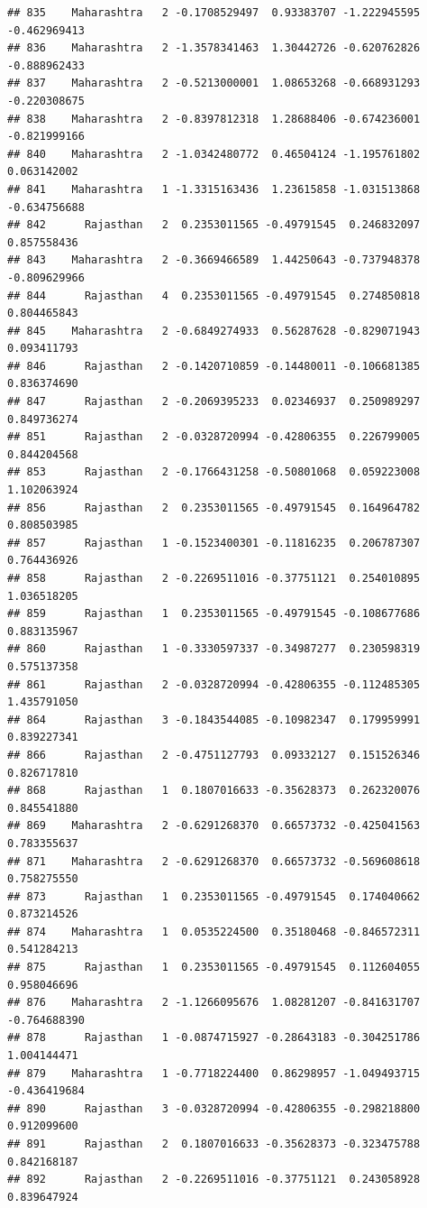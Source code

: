 \documentclass[
]{article}
\begin{document}
\begin{verbatim}
## 835    Maharashtra   2 -0.1708529497  0.93383707 -1.222945595 -0.462969413
## 836    Maharashtra   2 -1.3578341463  1.30442726 -0.620762826 -0.888962433
## 837    Maharashtra   2 -0.5213000001  1.08653268 -0.668931293 -0.220308675
## 838    Maharashtra   2 -0.8397812318  1.28688406 -0.674236001 -0.821999166
## 840    Maharashtra   2 -1.0342480772  0.46504124 -1.195761802  0.063142002
## 841    Maharashtra   1 -1.3315163436  1.23615858 -1.031513868 -0.634756688
## 842      Rajasthan   2  0.2353011565 -0.49791545  0.246832097  0.857558436
## 843    Maharashtra   2 -0.3669466589  1.44250643 -0.737948378 -0.809629966
## 844      Rajasthan   4  0.2353011565 -0.49791545  0.274850818  0.804465843
## 845    Maharashtra   2 -0.6849274933  0.56287628 -0.829071943  0.093411793
## 846      Rajasthan   2 -0.1420710859 -0.14480011 -0.106681385  0.836374690
## 847      Rajasthan   2 -0.2069395233  0.02346937  0.250989297  0.849736274
## 851      Rajasthan   2 -0.0328720994 -0.42806355  0.226799005  0.844204568
## 853      Rajasthan   2 -0.1766431258 -0.50801068  0.059223008  1.102063924
## 856      Rajasthan   2  0.2353011565 -0.49791545  0.164964782  0.808503985
## 857      Rajasthan   1 -0.1523400301 -0.11816235  0.206787307  0.764436926
## 858      Rajasthan   2 -0.2269511016 -0.37751121  0.254010895  1.036518205
## 859      Rajasthan   1  0.2353011565 -0.49791545 -0.108677686  0.883135967
## 860      Rajasthan   1 -0.3330597337 -0.34987277  0.230598319  0.575137358
## 861      Rajasthan   2 -0.0328720994 -0.42806355 -0.112485305  1.435791050
## 864      Rajasthan   3 -0.1843544085 -0.10982347  0.179959991  0.839227341
## 866      Rajasthan   2 -0.4751127793  0.09332127  0.151526346  0.826717810
## 868      Rajasthan   1  0.1807016633 -0.35628373  0.262320076  0.845541880
## 869    Maharashtra   2 -0.6291268370  0.66573732 -0.425041563  0.783355637
## 871    Maharashtra   2 -0.6291268370  0.66573732 -0.569608618  0.758275550
## 873      Rajasthan   1  0.2353011565 -0.49791545  0.174040662  0.873214526
## 874    Maharashtra   1  0.0535224500  0.35180468 -0.846572311  0.541284213
## 875      Rajasthan   1  0.2353011565 -0.49791545  0.112604055  0.958046696
## 876    Maharashtra   2 -1.1266095676  1.08281207 -0.841631707 -0.764688390
## 878      Rajasthan   1 -0.0874715927 -0.28643183 -0.304251786  1.004144471
## 879    Maharashtra   1 -0.7718224400  0.86298957 -1.049493715 -0.436419684
## 890      Rajasthan   3 -0.0328720994 -0.42806355 -0.298218800  0.912099600
## 891      Rajasthan   2  0.1807016633 -0.35628373 -0.323475788  0.842168187
## 892      Rajasthan   2 -0.2269511016 -0.37751121  0.243058928  0.839647924

\end{verbatim}
\end{document}
